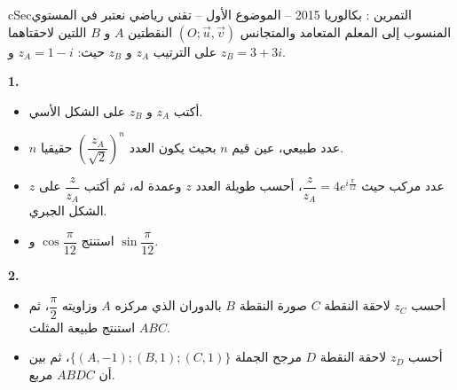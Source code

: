 \documentclass[12pt,a4paper]{article}
\newenvironment{BOX}[2]{\begin{otherlanguage}{english}\begin{arbox}{#1}{#2}}{\end{arbox}\end{otherlanguage}}
\newcounter{exo}
\newenvironment{tamrin}[1]{\stepcounter{exo}\begin{BOX}{cSec}{التمرين \theexo: #1}}{\end{BOX}}
\newenvironment{sq}{\begin{itemize}[leftmargin=2.4em,itemsep=3pt]}{\end{itemize}}
\newcommand{\qa}{\item[(أ)]}\newcommand{\qb}{\item[(ب)]}\newcommand{\qc}{\item[(جـ)]}\newcommand{\qd}{\item[(د)]}\newcommand{\qe}{\item[(هـ)]}
\newcommand{\QQ}[1]{\par\smallskip\textbf{#1.} }
\begin{document}
\begin{tamrin}{بكالوريا 2015 -- الموضوع الأول -- تقني رياضي}
نعتبر في المستوي المنسوب إلى المعلم المتعامد والمتجانس $(O;\vec u,\vec v)$ النقطتين $A$ و $B$ اللتين لاحقتاهما على الترتيب $z_A$ و $z_B$ حيث: $z_A=1-i$ و $z_B=3+3i$.

\QQ{1}
\begin{sq}
\qa أكتب $z_A$ و $z_B$ على الشكل الأسي.
\qb $n$ عدد طبيعي، عين قيم $n$ بحيث يكون العدد $\left(\dfrac{z_A}{\sqrt2}\right)^n$ حقيقيا.
\qc $z$ عدد مركب حيث $\dfrac{z}{z_A}=4e^{i\frac{\pi}{12}}$، أحسب طويلة العدد $z$ وعمدة له، ثم أكتب $\dfrac{z}{z_A}$ على الشكل الجبري.
\qd استنتج $\cos\dfrac{\pi}{12}$ و $\sin\dfrac{\pi}{12}$.
\end{sq}
\QQ{2}
\begin{sq}
\qa أحسب $z_C$ لاحقة النقطة $C$ صورة النقطة $B$ بالدوران الذي مركزه $A$ وزاويته $\dfrac{\pi}{2}$، ثم استنتج طبيعة المثلث $ABC$.
\qb أحسب $z_D$ لاحقة النقطة $D$ مرجح الجملة $\{(A,-1);(B,1);(C,1)\}$، ثم بين أن $ABDC$ مربع.
\end{sq}
\end{tamrin}
\end{document}
